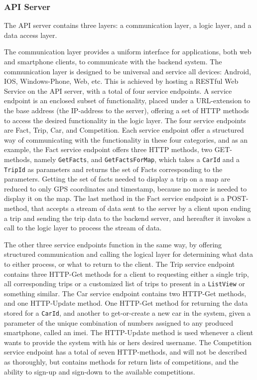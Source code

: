 \subsubsection{API Server}\label{sec:api_server}
The API server contains three layers: a communication layer, a logic layer, and a data access layer.

The communication layer provides a uniform interface for applications, both web and smartphone clients, to communicate with the backend system. The communication layer is designed to be universal and service all devices: Android, IOS, Windows-Phone, Web, etc. This is achieved by hosting a RESTful Web Service on the API server, with a total of four service endpoints. A service endpoint is an enclosed subset of functionality, placed under a URL-extension to the base address (the IP-address to the server), offering a set of HTTP methods to access the desired functionality in the logic layer. The four service endpoints are Fact, Trip, Car, and Competition. Each service endpoint offer a structured way of communicating with the functionality in these four categories, and as an example, the Fact service endpoint offers three HTTP methods, two GET-methods, namely \texttt{GetFacts}, and \texttt{GetFactsForMap}, which takes a \texttt{CarId} and a \texttt{TripId} as parameters and returns the set of Facts corresponding to the parameters. Getting the set of facts needed to display a trip on a map are reduced to only GPS coordinates and timestamp, because no more is needed to display it on the map. The last method in the Fact service endpoint is a POST-method, that accepts a stream of data sent to the server by a client upon ending a trip and sending the trip data to the backend server, and hereafter it invokes a call to the logic layer to process the stream of data.

The other three service endpoints function in the same way, by offering structured communication and calling the logical layer for determining what data to either process, or what to return to the client. The Trip service endpoint contains three HTTP-Get methods for a client to requesting either a single trip, all corresponding trips or a customized list of trips to present in a \texttt{ListView} or something similar. The Car service endpoint contains two HTTP-Get methods, and one HTTP-Update method. One HTTP-Get method for returning the data stored for a \texttt{CarId}, and another to get-or-create a new car in the system, given a parameter of the unique combination of numbers assigned to any produced smartphone, called an imei. The HTTP-Update method is used whenever a client wants to provide the system with his or hers desired username. The Competition service endpoint has a total of seven HTTP-methods, and will not be described as thoroughly, but contains methods for return lists of competitions, and the ability to sign-up and sign-down to the available competitions.

